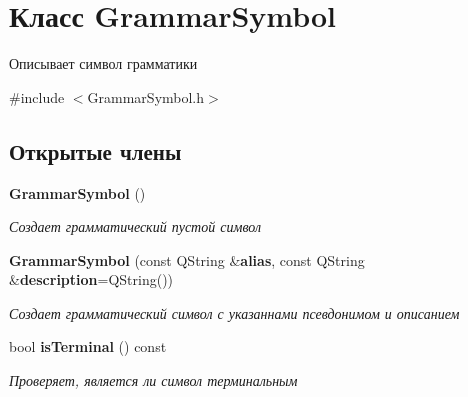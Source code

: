 \section{Класс \-Grammar\-Symbol}
\label{classGrammarSymbol}


Описывает символ грамматики  




{\ttfamily \#include $<$\-Grammar\-Symbol.\-h$>$}

\subsection*{Открытые члены}
\begin{DoxyCompactItemize}
\item 
{\bf \-Grammar\-Symbol} ()\label{classGrammarSymbol_a08cda21b11486c614c407756eb15112d}

\begin{DoxyCompactList}\small\item\em Создает грамматический пустой символ \end{DoxyCompactList}\item 
{\bf \-Grammar\-Symbol} (const \-Q\-String \&{\bf alias}, const \-Q\-String \&{\bf description}=\-Q\-String())
\begin{DoxyCompactList}\small\item\em Создает грамматический символ с указаннами псевдонимом и описанием \end{DoxyCompactList}\item 
bool {\bf is\-Terminal} () const 
\begin{DoxyCompactList}\small\item\em Проверяет, является ли символ терминальным \end{DoxyCompactList}\end{DoxyCompactItemize}
